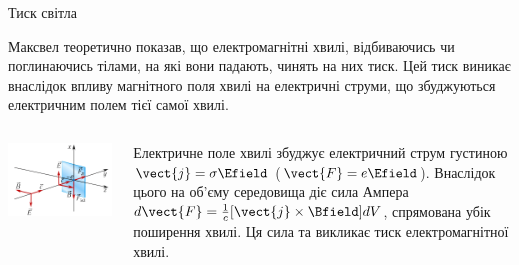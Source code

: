 \documentclass[onlytextwidth]{beamer}
\begin{document}
\begin{frame}{Тиск світла}{}\small
	\begin{block}{}\justifying
		Максвел теоретично показав, що електромагнітні хвилі, відбиваючись чи поглинаючись тілами, на які  вони падають, чинять на них тиск. Цей тиск виникає внаслідок впливу магнітного поля хвилі на електричні струми, що збуджуються електричним полем тієї самої хвилі.
	\end{block}
	\vspace*{-1.25em}
	\begin{columns}
		\begin{column}{0.4\linewidth}
			\begin{center}
				\includegraphics[width=1\linewidth]{pictures/elmagpresure}
			\end{center}
		\end{column}
		\begin{column}{0.6\linewidth}
			\begin{block}{}\justifying\small
				Електричне поле хвилі збуджує електричний струм густиною $ \vect{j} = \sigma\Efield $ ($ \vect{F} = e\Efield $). Внаслідок цього на
				об'єму середовища діє сила Ампера $ d\vect{F} = \frac1c[\vect{j}\times\Bfield] dV$, спрямована убік поширення хвилі. Ця сила та викликає
				тиск електромагнітної хвилі.
        	\end{block}
		\end{column}
	\end{columns}
            \begin{block}{}\justifying\small
				\begin{overprint}

\end{overprint}
\end{block}
\end{frame}
\end{document}

